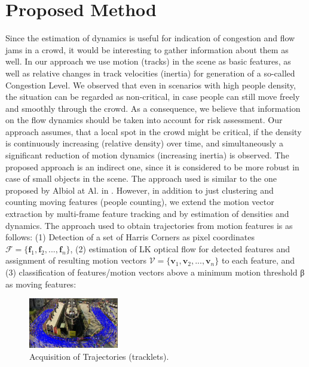 \documentclass[a4paper, 10pt, journal]{wissarbIEEE}      %
\begin{document}
\section{Proposed Method}
\label{sec:method}
Since the estimation of dynamics is useful for indication of congestion and flow jams in a crowd, it would be interesting to gather information about them as well. In our approach we use motion (tracks) in the scene as basic features, as well as relative changes in track velocities (inertia) for generation of a so-called Congestion Level. We observed that even in scenarios with high people density, the situation can be regarded as non-critical, in case people can still move freely and smoothly through the crowd. As a consequence, we believe that information on the flow dynamics should be taken into account for risk assessment. Our approach assumes, that a local spot in the crowd might be critical, if the density is continuously increasing (relative density) over time, and simultaneously a signiﬁcant reduction of motion dynamics (increasing inertia) is observed. The proposed approach is an indirect one, since it is considered to be more robust in case of small objects in the scene. The approach used is similar to the one proposed by Albiol at Al. in \cite{albiol}. However, in addition to just clustering and counting moving features (people counting), we extend the motion vector extraction by multi-frame feature tracking and by estimation of densities and dynamics. The approach used to obtain trajectories from motion features is as follows: (1) Detection of a set of Harris Corners \cite{harris} as pixel coordinates $\mathcal{F} = \{\mathbf{f}_1, \mathbf{f}_2, ..., \mathbf{f}_n\}$, (2) estimation of LK optical flow \cite{LK} for detected features and assignment of resulting motion vectors $\mathcal{V} = \{\mathbf{v}_1, \mathbf{v}_2, ..., \mathbf{v}_n\}$ to each feature, and (3) classiﬁcation of features/motion vectors above a minimum motion threshold β as moving features:

\begin{figure}[h]
   \centering
   \includegraphics[width=0.35\textwidth]{fig/trajektorien.png}
   \caption{Acquisition of Trajectories (tracklets).}
   \label{fig:trajectories}
\end{figure}
\end{document}
